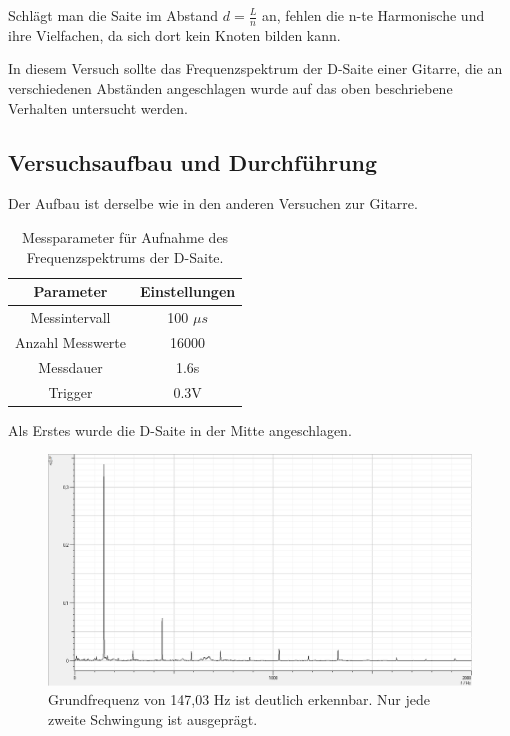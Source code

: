 \documentclass[12pt,a4paper]{article}
\begin{document}
Schlägt man die Saite im Abstand $d=\frac{L}{n}$ an, fehlen die n-te Harmonische und ihre Vielfachen, da sich dort kein Knoten bilden kann.

In diesem Versuch sollte das Frequenzspektrum der D-Saite einer Gitarre, die an verschiedenen Abständen angeschlagen wurde auf das oben beschriebene Verhalten untersucht werden.

\subsection{Versuchsaufbau und Durchführung}
Der Aufbau ist derselbe wie in den anderen Versuchen zur Gitarre. 

\begin{table}[H]\centering
\caption{Messparameter für Aufnahme des Frequenzspektrums der D-Saite.}
\begin{tabular}{c|c}
Parameter & Einstellungen \\ 
\hline
Messintervall & 100 $\mu s$ \\ 
Anzahl Messwerte & 16000 \\ 
Messdauer & 1.6s \\ 
Trigger & 0.3V \\ 
\end{tabular}
\end{table}

Als Erstes wurde die D-Saite in der Mitte angeschlagen.
\begin{figure}[H]
\centering
\includegraphics[scale=0.45]{Bilder/Spektrum_Mitte.png}
\caption{Grundfrequenz von 147,03 Hz ist deutlich erkennbar. Nur jede zweite Schwingung ist ausgeprägt.}
\end{figure}
\end{document}
